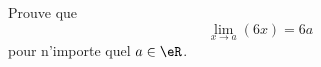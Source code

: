 

\begin{exercice}\label{exo204}

Prouve que 
\[ 
  \lim_{x\to a}(6x)=6a
\]
pour n'importe quel $a\in\eR$.
\end{exercice}
